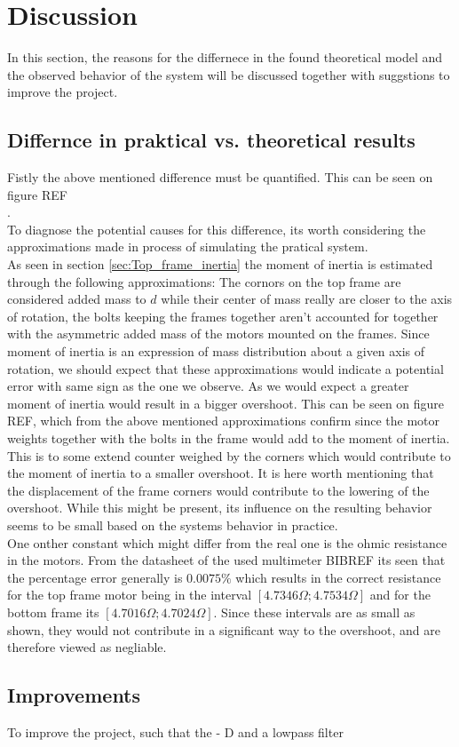 \documentclass[../../main]{subfiles}
\begin{document}
\section{Discussion}
\label{sec:discussion}
In this section, the reasons for the differnece in the found theoretical model and the observed behavior of the system will be discussed together with suggstions to improve the project.
\subsection{Differnce in praktical vs. theoretical results}
Fistly the above mentioned difference must be quantified. This can be seen on figure REF\\
[Figure of difference in theoretical and practical data].\\
To diagnose the potential causes for this difference, its worth considering the approximations made in process of simulating the pratical system.\\
As seen in section \ref{sec:Top_frame_inertia} the moment of inertia is estimated through the following approximations: The cornors on the top frame are considered added mass to $d$ while their center of mass really are closer to the axis of rotation, the bolts keeping the frames together aren't accounted for together with the asymmetric added mass of the motors mounted on the frames. Since moment of inertia is an expression of mass distribution about a given axis of rotation, we should expect that these approximations would indicate a potential error with same sign as the one we observe. As we would expect a greater moment of inertia would result in a bigger overshoot. This can be seen on figure REF, which from the above mentioned approximations confirm since the motor weights together with the bolts in the frame would add to the moment of inertia. This is to some extend counter weighed by the corners which would contribute to the moment of inertia to a smaller overshoot. It is here worth mentioning that the displacement of the frame corners would contribute to the lowering of the overshoot. While this might be present, its influence on the resulting behavior seems to be small based on the systems behavior in practice.\\
One onther constant which might differ from the real one is the ohmic resistance in the motors. From the datasheet of the used multimeter BIBREF its seen that the percentage error generally is $0.0075\%$ which results in the correct resistance for the top frame motor being in the interval $[4.7346\Omega;4.7534\Omega]$ and for the bottom frame its $[4.7016\Omega;4.7024\Omega]$. Since these intervals are as small as shown, they would not contribute in a significant way to the overshoot, and are therefore viewed as negliable.\\
\subsection{Improvements}
To improve the project, such that the 
- D and a lowpass filter
\end{document}
